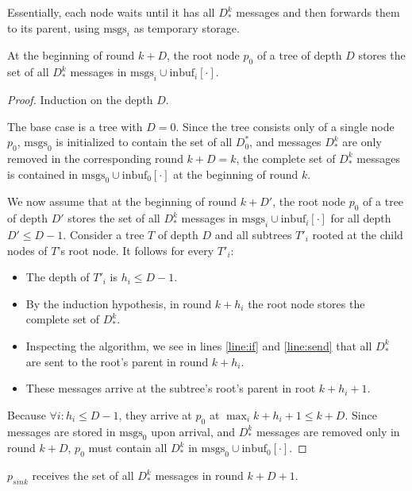 Essentially, each node waits until it has all $D_*^k$ messages and
then forwards them to its parent, using $\text{msgs}_i$ as temporary storage.

\begin{lemma} \label{lem:tpipe}
At the beginning of round $k + D$, the root node $p_0$ of a tree of depth $D$
stores the set of all $D_*^k$ messages in $\text{msgs}_i \cup \text{inbuf}_i[\cdot]$.
\end{lemma}

\begin{proof}
Induction on the depth $D$.

The base case is a tree with $D = 0$. Since the tree consists only of a single node $p_0$,
$\text{msgs}_0$ is initialized to contain the set of all $D_0^*$, 
and messages $D_*^k$ are only removed in the corresponding round $k + D = k$, 
the complete set of $D_*^k$ messages is contained in 
$\text{msgs}_0 \cup \text{inbuf}_0[\cdot]$ at the beginning of round $k$.

We now assume that at the beginning of round $k + D'$, the root node $p_0$ of a 
tree of depth $D'$ stores the set of all $D_*^k$ messages in 
$\text{msgs}_i \cup \text{inbuf}_i[\cdot]$ for all depth $D' \leq D - 1$.
Consider a tree $T$ of depth $D$ and all subtrees $T'_i$ rooted at
the child nodes of $T$'s root node. It follows for every $T'_i$:

\begin{itemize}
\item The depth of $T'_i$ is $h_i \leq D - 1$.
\item By the induction hypothesis, in round $k + h_i$ the root node stores
      the complete set of $D_*^k$.
\item Inspecting the algorithm, we see in lines \ref{line:if} and \ref{line:send}
      that all $D_*^k$ are sent to the root's parent in round $k + h_i$.
\item These messages arrive at the subtree's root's parent in root $k + h_i + 1$.
\end{itemize}

Because $\forall i: h_i \leq D - 1$, they arrive at $p_0$ at 
$\max_i k + h_i + 1 \leq k + D$. Since messages are stored in $\text{msgs}_0$
upon arrival, and $D_*^k$ messages are removed only in round $k + D$,
$p_0$ must contain all $D_*^k$ in $\text{msgs}_0 \cup \text{inbuf}_0[\cdot]$.
\end{proof}

\begin{theorem}
$p_{sink}$ receives the set of all $D_*^k$ messages in round $k + D + 1$.
\end{theorem}

